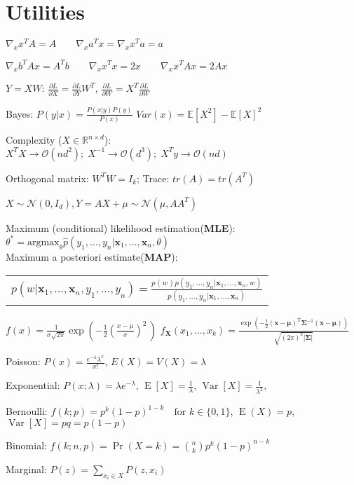 
\section{Utilities}
    $\nabla_x x^TA = A \qquad \nabla_xa^Tx = \nabla_x x^Ta = a$
    
    $\nabla_x b^TAx = A^Tb \qquad \nabla_xx^Tx = 2x \qquad \nabla_x x^TAx = 2Ax$

    $Y=XW$: $\frac{\partial L}{\partial X} = \frac{\partial L}{\partial Y}W^T$, $\frac{\partial L}{\partial W} = X^T\frac{\partial L}{\partial W}$
    
    Bayes: $P(y|x)= \frac{P(x|y)P(y)}{P(x)}$ $Var(x) = \mathbb{E}[X^2] - \mathbb{E}[X]^2$
    
    Complexity ($X\in \mathbb{R}^{n\times d}$):\\\hangindent=0.5cm $X^TX \to \mathcal{O}(nd^2); \; X^{-1} \to \mathcal{O}(d^3);\; X^Ty \to  \mathcal{O}(nd)$ 

    Orthogonal matrix: $W^TW=I_k$; Trace: $tr(A) = tr(A^T)$

    $X \sim \mathcal{N}(0, I_d), Y = AX + \mu \sim \mathcal{N}(\mu, AA^T) $

    Maximum (conditional) likelihood estimation(\textbf{MLE}):\\
    $\theta^* = \mathrm{argmax}_\theta
    \hat{p}(y_1,\dots,y_n|\boldsymbol{x}_1,\dots,\boldsymbol{x}_n,\theta)$\\
    Maximum a posteriori estimate(\textbf{MAP}):\\
    \begin{tabular}{@{}c@{}}
    $p(w|\boldsymbol{x}_1,\dots,\boldsymbol{x}_n,y_1,\dots,y_n) = 
    \frac{p(w)p(y_1,\dots,y_n|\boldsymbol{x}_1,\dots,\boldsymbol{x}_n,w)}
    {p(y_1,\dots,y_n|\boldsymbol{x}_1,\dots,\boldsymbol{x}_n)}$
    \end{tabular}
   $f(x) = \frac{1}{\sigma\sqrt{2\pi}} \exp\left( -\frac{1}{2}\left(\frac{x-\mu}{\sigma}\right)^{\!2}\,\right)$
   ${\displaystyle f_{\mathbf {X} }(x_{1},\ldots ,x_{k})={\frac {\exp \left(-{\frac {1}{2}}({\mathbf {x} }-{\boldsymbol {\mu }})^{\mathrm {T} }{\boldsymbol {\Sigma }}^{-1}({\mathbf {x} }-{\boldsymbol {\mu }})\right)}{\sqrt {(2\pi )^{k}|{\boldsymbol {\Sigma }}|}}}}
$

Poisson: $P(x)=\frac{e^{-\lambda}\lambda^x}{x!}$, ${\displaystyle E(X)=V(X)=\lambda }$

Exponential: ${\displaystyle P(x;\lambda )= \lambda e^{-\lambda}}$, ${\displaystyle \operatorname {E} [X]={\frac {1}{\lambda }}}$, ${\displaystyle \operatorname {Var} [X]={\frac {1}{\lambda ^{2}}},}$

Bernoulli: ${\displaystyle f(k;p)=p^{k}(1-p)^{1-k}\quad {\text{for }}k\in \{0,1\}}$, ${\displaystyle \operatorname {E} \left(X\right)=p}$, $\operatorname {Var} [X]=pq=p(1-p)$

Binomial: ${\displaystyle f(k;n,p)=\Pr(X=k)={\binom {n}{k}}p^{k}(1-p)^{n-k}}$

Marginal: $P(z) = \sum_{x_i \in X} P(z, x_i)$
   